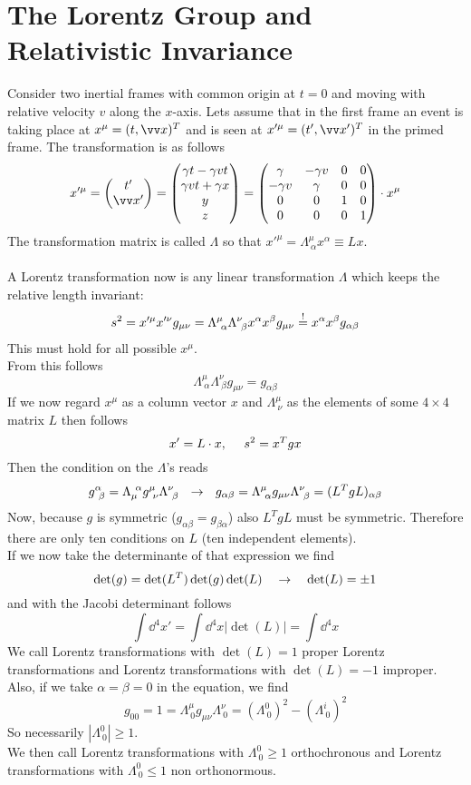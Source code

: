 \section{The Lorentz Group and Relativistic Invariance}
Consider two inertial frames with common origin at $t = 0$ and moving with relative velocity $v$ along the $x$-axis. Lets assume that in the first frame an event is taking place at $x^\mu = (t, \vx)^T$ and is seen at $x'^\mu = (t', \vx')^T$ in the primed frame. The transformation is as follows
\[ x'^\mu = \vektorz{t'}{\vx'} = \begin{pmatrix} \gamma t - \gamma v t \\  \gamma v t + \gamma x\\ y \\z\end{pmatrix} = \begin{pmatrix} \gamma & - \gamma v & 0 & 0 \\ -\gamma v & \gamma & 0 & 0 \\ 0 & 0 & 1 & 0 \\ 0 & 0 & 0 & 1\end{pmatrix}\cc x^\mu\]
The transformation matrix is called $\Lambda$ so that $x'^\mu = \Lambda^\mu_{~\alpha} x^\alpha \equiv L x$.\\
\\A Lorentz transformation now is any linear transformation $\Lambda$ which keeps the relative length invariant:
\[ s^2 = x'^\mu x'^\nu g_{\mu\nu} = \Lambda^\mu_{~\alpha} \Lambda^\nu_{~\beta}x^\alpha x^\beta g_{\mu\nu}\overset{!}{=} x^\alpha x^\beta g_{\alpha\beta}\]
This must hold for all possible $x^\mu$.\\
From this follows
\[ \Lambda^\mu_{~\alpha} \Lambda^\nu_{~\beta} g_{\mu\nu} = g_{\alpha\beta}\]
If we now regard $x^\mu$ as a column vector $x$ and $\Lambda^\mu_{~\nu}$ as the elements of some $4\times 4$ matrix $L$ then follows
\[x' = L \cdot x, ~~~~ s^2 = x^Tg x\]
Then the condition on the $\Lambda$'s reads
\[g^\alpha_{~\beta} = \Lambda_\mu^{~\alpha} g^\mu_{~\nu} \Lambda^\nu_{~\beta}~~\rightarrow~~ g_{\alpha\beta} = \Lambda^\mu_{~\alpha} g_{\mu\nu}\Lambda^\nu_{~\beta} = (L^TgL)_{\alpha\beta}\]
Now, because $g$ is symmetric ($g_{\alpha\beta} = g_{\beta\alpha}$) also $L^TgL$ must be symmetric. Therefore there are only ten conditions on $L$ (ten independent elements).\\
If we now take the determinante of that expression we find
\[\det(g) = \det(L^T)\det(g) \det(L)~~~\rightarrow~~~ \det(L) = \pm 1\]
and with the Jacobi determinant follows
\[ \int \dd ^4 x' = \int \dd ^4 x| \det(L) | = \int \dd ^4 x\]
We call Lorentz transformations with $\det(L) = 1$ proper Lorentz transformations and Lorentz transformations with $\det(L) = -1$ improper.\\
Also, if we take $\alpha = \beta = 0$ in the equation, we find 
\[g_{00} = 1 = \Lambda^{\mu}_{~0} g_{\mu\nu} \Lambda^\nu_{~0} = (\Lambda^0_{~0})^2 - (\Lambda^i_{~0})^2\]
So necessarily $|\Lambda^0_{~0}| \geq 1$.\\
We then call Lorentz transformations with $\Lambda^0_{~0} \geq 1$ orthochronous and Lorentz transformations with $\Lambda^0_{~0} \leq 1$ non orthonormous.

